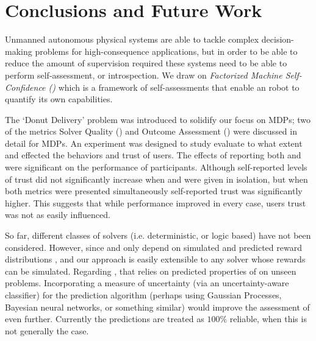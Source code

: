 \section{Conclusions and Future Work} \label{sec:conclusions}
Unmanned autonomous physical systems are able to tackle complex decision-making problems for high-consequence applications, but in order to be able to reduce the amount of supervision required these systems need to be able to perform self-assessment, or introspection. We draw on \emph{Factorized Machine Self-Confidence (\famsec)} which is a framework of self-assessments that enable an robot to quantify its own capabilities.

The `Donut Delivery' problem was introduced to solidify our focus on MDPs; two of the \famsec{} metrics Solver Quality (\xQ) and Outcome Assessment (\xO) were discussed in detail for MDPs. An experiment was designed to study evaluate to what extent \xQ{} and \xO{} effected the behaviors and trust of users. The effects of reporting both \xQ{} and \xO{} were significant on the performance of participants. Although self-reported levels of trust did not significantly increase when \xQ{} and \xO{} were given in isolation, but when both metrics were presented simultaneously self-reported trust was significantly higher. This suggests that while performance improved in every case, users trust was not as easily influenced.

So far, different classes of solvers (i.e. deterministic, or logic based) have not been considered. However, since \xQ{} and \xO{} only depend on simulated and predicted reward distributions \rwd{}, and \rwdtrust{} our approach is easily extensible to any solver whose rewards can be simulated. Regarding \xQ{}, that relies on predicted properties of \rwdtrust{} on unseen problems. Incorporating a measure of uncertainty (via an uncertainty-aware classifier) for the prediction algorithm (perhaps using Gaussian Processes, Bayesian neural networks, or something similar) would improve the assessment of \xQ{} even further. Currently the predictions are treated as $100\%$ reliable, when this is not generally the case.

